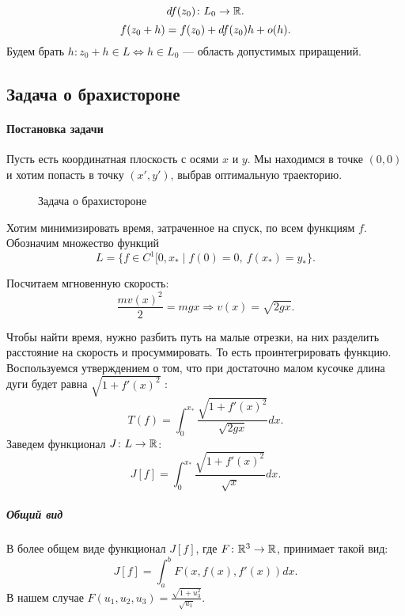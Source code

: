\[
	df(z_0) \colon L_0 \to  \mathbb{R}
.\] 
\[
	f(z_0 + h) = f(z_0) + df(z_0) h + o(h)
.\] 
Будем брать $ h\colon z_0 + h \in L \Longleftrightarrow h \in  L_0$ --- область допустимых приращений.

\subsection{Задача о брахистороне}
\paragraph{Постановка задачи}
Пусть есть координатная плоскость с осями $ x$ и  $ y$. Мы находимся в точке  $ (0, 0)$ и хотим попасть в точку  $ (x', y')$, выбрав оптимальную траекторию.
\begin{figure}[ht]
    \centering
    \caption{Задача о брахистороне}
    \label{fig:brachistochrone-problem}
\end{figure}
Хотим минимизировать время, затраченное на спуск, по всем функциям $ f$.
Обозначим множество функций
\[
	L = \{f \in C^{1}[0, x_{*} \mid f(0) = 0, ~f(x_*) = y_*\}
.\] 

Посчитаем мгновенную скорость: 
\[
	\frac{mv(x)^2}{2} = mgx \Longrightarrow v(x) = \sqrt{ 2gx} 
.\] 

Чтобы найти время, нужно разбить путь на малые отрезки, на них разделить расстояние на скорость и просуммировать. То есть проинтегрировать функцию. Воспользуемся утверждением о том, что при достаточно малом кусочке длина дуги будет равна $ \sqrt{ 1+ f'(x)^2} $ :
\[
	T(f) = \int_{0}^{x_*} \frac{\sqrt{ 1+f'(x)^2}}{\sqrt{ 2gx} }dx  
.\] 
Заведем функционал $ J\colon L \to  \mathbb{R}$:
 \[
	 J[f] = \int_{0}^{x_*} \frac{\sqrt{ 1+f'(x)^2}}{\sqrt{ x} }dx  
.\] 

\subparagraph{Общий вид}
В более общем виде функционал $ J[f]$, где $ F\colon \mathbb{R}^3 \to  \mathbb{R}$, принимает такой вид:
\[
	J[f] = \int_{a}^{b} F(x, f(x), f'(x)) dx  
.\] 
В нашем случае $ F(u_1, u_2, u_3) = \frac{\sqrt{ 1 + u_3^2}}{\sqrt{ u_1} }  $.

